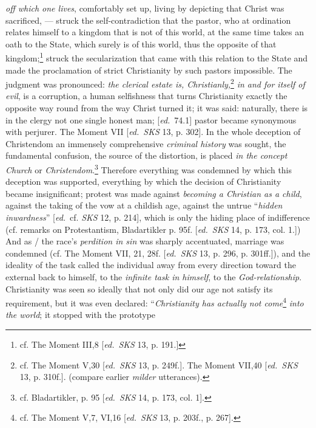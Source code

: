 \documentclass[12pt,a4paper,openany]{book}
\newcommand{\kpage}[1]{\marginnote{\footnotesize\textit{[#1]}}}
\newcommand{\ed}[1]{{\small[\textit{ed.}\ #1]}}
\begin{document}
\emph{off which one lives}, comfortably set up, living by depicting that Christ
was sacrificed, --- struck the self-contradiction that the pastor, who at
ordination relates himself to a kingdom that is not of this world,
at the same time takes an oath to the State, which surely is of this world,
thus the opposite of that kingdom;\footnote[109]{cf. The Moment III,8 \ed{\emph{SKS} 13, p. 191.}}
struck the secularization that came
with this relation to the State and made the proclamation of strict Christianity
by such pastors impossible. The judgment was pronounced:
\emph{the clerical estate is, Christianly,}\footnote[110]{cf. The Moment V,30 \ed{\emph{SKS} 13, p. 249f.}. The Moment VII,40 \ed{\emph{SKS} 13, p. 310f.}.
(compare earlier \emph{milder} utterances).}
\emph{in and for itself of evil}, is a corruption, a
human selfishness that turns Christianity exactly the opposite way round
from the way Christ turned it; it was said: naturally, there is in the clergy
\kpage{162}not one single honest man; \ed{74.1} pastor became synonymous with
perjurer. The Moment VII \ed{\emph{SKS} 13, p. 302}. In the whole deception of
Christendom an immensely comprehensive \emph{criminal history} was sought,
the fundamental confusion, the source of the distortion, is placed \emph{in the concept Church} or \emph{Christendom}.\footnote[111]{cf. Bladartikler, p. 95 \ed{\emph{SKS} 14, p. 173, col. 1}.}
Therefore everything was condemned by which this deception was supported, everything
by which the decision of Christianity became insignificant; protest was made
against \emph{becoming a Christian as a child}, against the taking of the vow at
a childish age, against the untrue ``\emph{hidden inwardness}'' \ed{cf. \emph{SKS} 12, p.
214}, which is only the hiding place of indifference (cf. remarks on Protestantism,
Bladartikler p. 95f. \ed{\emph{SKS} 14, p. 173, col. 1.}) And as / the race's
\emph{perdition in sin} was sharply accentuated, marriage was condemned (cf.
The Moment VII, 21, 28f. \ed{\emph{SKS} 13, p. 296, p. 301ff.}), and the ideality
of the task called the individual away from every direction toward the external
back to himself, to the \emph{infinite task in himself}, to the \emph{God-relationship}.
Christianity was seen so ideally that not only did our age not satisfy
its requirement, but it was even declared: ``\emph{Christianity
has actually not come}\footnote[112]{cf. The Moment V,7, VI,16 \ed{\emph{SKS} 13, p. 203f., p. 267}.} \emph{into the world}; it stopped with the prototype
\end{document}
